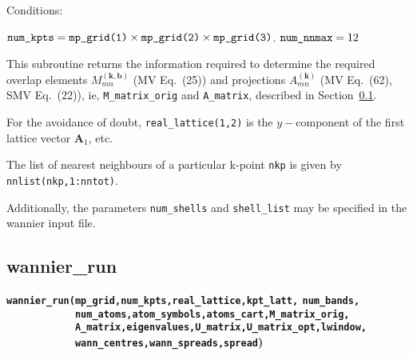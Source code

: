 Conditions:
\begin{itemize}
\cond $\verb#num_kpts# = \verb#mp_grid(1)# \times \verb#mp_grid(2)#
\times \verb#mp_grid(3)#$.
\cond $\verb#num_nnmax# = 12$
\end{itemize}

This subroutine returns the information required to determine the
required overlap elements $M_{mn}^{(\mathbf{k,b})}$ (MV Eq.~(25)) and
projections $A_{mn}^{(\mathbf{k})}$ (MV Eq.~(62), SMV Eq.~(22)),
ie, \verb#M_matrix_orig# and \verb#A_matrix#, described in
Section~\ref{wannier_run}.

For the avoidance of doubt, \verb#real_lattice(1,2)# is the
$y-$component of the first lattice vector $\mathbf{A}_{1}$, etc.

The list of nearest neighbours of a particular k-point \verb#nkp# is
given by \verb#nnlist(nkp,1:nntot)#.  

Additionally, the parameters \verb#num_shells# and \verb#shell_list#
may be specified in the wannier input file.

\subsection{wannier\_run} \label{wannier_run}

{\noindent \bf \verb#wannier_run(mp_grid,num_kpts,real_lattice,kpt_latt,#
\verb#num_bands,#\\
\verb#            num_atoms,atom_symbols,atoms_cart,M_matrix_orig,#\\
\verb#            A_matrix,eigenvalues,U_matrix,U_matrix_opt,lwindow,#\\
\verb#            wann_centres,wann_spreads,spread#)}

